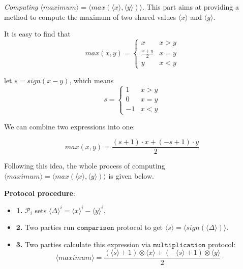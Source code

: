 \documentclass[letterpaper]{article} %
\begin{document}
       \emph{Computing} $ \langle maximum\rangle  = \langle max(\langle x\rangle,\langle y\rangle)\rangle $.
       This part aims at providing a method to compute the maximum of two shared values $\langle x \rangle$ and $\langle y \rangle$.

       It is easy to find that
       $$max(x,y) = \left\{\begin{matrix}
           x & x>y\\
           \frac{x+ y}{2} & x=y\\
           y & x<y
           \end{matrix}\right.$$

       let $s = sign(x-y)$, which means
       $$s = \left\{\begin{matrix}
           1 & x>y\\
           0 & x=y\\
           -1 & x<y
           \end{matrix}\right.$$

       We can combine two expressions into one:

       $$max(x,y) = \frac{(s+1)\cdot x+ (-s+1)\cdot y}{2}$$


       Following this idea, the whole process of computing $\langle maximum\rangle  = \langle max(\langle x\rangle,\langle y\rangle)\rangle$ is given below.

       \textbf{Protocol procedure}:
       \begin{itemize}
           \item \textbf{1.} $\mathcal{P}_{i}$ sets $\langle \Delta \rangle^{i}=\langle x\rangle ^{i}-\langle y\rangle ^{i}$.
           \item \textbf{2.} Two parties run $\mathtt{comparison}$ protocol to get $\langle s\rangle =\langle sign(\langle \Delta \rangle)\rangle$.%
           \item \textbf{3.} Two parties calculate this expression via $\mathtt{multiplication}$ protocol:
           $$\langle maximum\rangle=\frac{(\langle s\rangle+1)\otimes \langle x\rangle+ (-\langle s\rangle+1)\otimes \langle y\rangle}{2}$$
       \end{itemize}
\end{document}
